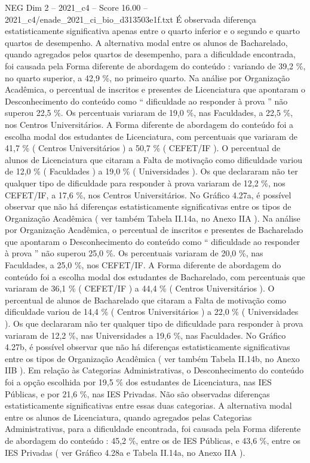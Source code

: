 \begin{textsample}{NEG Dim 2 – 2021\_c4 – Score 16.00 – 2021\_c4/enade\_2021\_ci\_bio\_d313503e1f.txt}
É observada diferença estatisticamente significativa apenas entre o quarto inferior e o segundo e quarto quartos de desempenho.
A alternativa modal entre os alunos de Bacharelado, quando agregados pelos quartos de desempenho, para a dificuldade encontrada, foi causada pela Forma diferente de abordagem do conteúdo : variando de 39,2 \%, no quarto superior, a 42,9 \%, no primeiro quarto.
Na análise por Organização Acadêmica, o percentual de inscritos e presentes de Licenciatura que apontaram o Desconhecimento do conteúdo como “ dificuldade ao responder à prova ” não superou 22,5 \%.
Os percentuais variaram de 19,0 \%, nas Faculdades, a 22,5 \%, nos Centros Universitários.
A Forma diferente de abordagem do conteúdo foi a escolha modal dos estudantes de Licenciatura, com percentuais que variaram de 41,7 \% ( Centros Universitários ) a 50,7 \% ( CEFET/IF ).
O percentual de alunos de Licenciatura que citaram a Falta de motivação como dificuldade variou de 12,0 \% ( Faculdades ) a 19,0 \% ( Universidades ).
Os que declararam não ter qualquer tipo de dificuldade para responder à prova variaram de 12,2 \%, nos CEFET/IF, a 17,6 \%, nos Centros Universitários.
No Gráfico 4.27a, é possível observar que não há diferenças estatisticamente significativas entre os tipos de Organização Acadêmica ( ver também Tabela II.14a, no Anexo IIA ).
Na análise por Organização Acadêmica, o percentual de inscritos e presentes de Bacharelado que apontaram o Desconhecimento do conteúdo como “ dificuldade ao responder à prova ” não superou 25,0 \%.
Os percentuais variaram de 20,0 \%, nas Faculdades, a 25,0 \%, nos CEFET/IF.
A Forma diferente de abordagem do conteúdo foi a escolha modal dos estudantes de Bacharelado, com percentuais que variaram de 36,1 \% ( CEFET/IF ) a 44,4 \% ( Centros Universitários ).
O percentual de alunos de Bacharelado que citaram a Falta de motivação como dificuldade variou de 14,4 \% ( Centros Universitários ) a 22,0 \% ( Universidades ).
Os que declararam não ter qualquer tipo de dificuldade para responder à prova variaram de 12,2 \%, nas Universidades a 19,6 \%, nas Faculdades.
No Gráfico 4.27b, é possível observar que não há diferenças estatisticamente significativas entre os tipos de Organização Acadêmica ( ver também Tabela II.14b, no Anexo IIB ).
Em relação às Categorias Administrativas, o Desconhecimento do conteúdo foi a opção escolhida por 19,5 \% dos estudantes de Licenciatura, nas IES Públicas, e por 21,6 \%, nas IES Privadas.
Não são observadas diferenças estatisticamente significativas entre essas duas categorias.
A alternativa modal entre os alunos de Licenciatura, quando agregados pelas Categorias Administrativas, para a dificuldade encontrada, foi causada pela Forma diferente de abordagem do conteúdo : 45,2 \%, entre os de IES Públicas, e 43,6 \%, entre os IES Privadas ( ver Gráfico 4.28a e Tabela II.14a, no Anexo IIA ).

\end{textsample}
